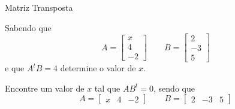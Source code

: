 \begin{exercicios}{Matriz Transposta}
    \begin{exercicio}
        Sabendo que 
        \[ A = \left[ \begin{array}{r} x \\  4 \\ -2 \end{array} \right] \qquad
           B = \left[ \begin{array}{r} 2 \\ -3 \\  5 \end{array} \right] \]
        e que $A^tB=4$ determine o valor de $x$.
    \end{exercicio}

    \begin{exercicio}
        Encontre um valor de $x$ tal que $AB^t=0$, sendo que 
        \[ A = \left[ \begin{array}{ccc} x & 4 & -2 \end{array} \right]  \qquad
           B = \left[ \begin{array}{ccc} 2 & -3 & 5 \end{array} \right]
        \]
    \end{exercicio}
     
\end{exercicios} %
            
